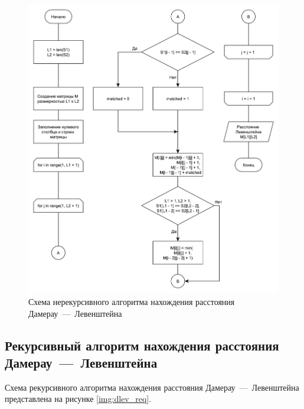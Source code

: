 \begin{figure}[h]
	\centering
	\includegraphics[scale=0.6]{images/dlev.pdf}
	\caption{Схема нерекурсивного алгоритма нахождения расстояния Дамерау~---~Левенштейна}
	\label{img:dlev}
\end{figure}


\subsection{Рекурсивный алгоритм нахождения расстояния Дамерау~---~Левенштейна}

Схема рекурсивного алгоритма нахождения расстояния Дамерау~---~Левенштейна представлена на рисунке \ref{img:dlev_req}.

